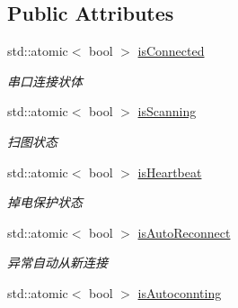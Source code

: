 \subsection*{Public Attributes}
\begin{DoxyCompactItemize}
\item 
std\+::atomic$<$ bool $>$ \hyperlink{classydlidar_1_1_y_dlidar_driver_a4457578961d36ce22035d778c0fd7f06}{is\+Connected}\hypertarget{classydlidar_1_1_y_dlidar_driver_a4457578961d36ce22035d778c0fd7f06}{}\label{classydlidar_1_1_y_dlidar_driver_a4457578961d36ce22035d778c0fd7f06}

\begin{DoxyCompactList}\small\item\em 串口连接状体 \end{DoxyCompactList}\item 
std\+::atomic$<$ bool $>$ \hyperlink{classydlidar_1_1_y_dlidar_driver_a245115a8c8a4f98d988fbee06810d0a4}{is\+Scanning}\hypertarget{classydlidar_1_1_y_dlidar_driver_a245115a8c8a4f98d988fbee06810d0a4}{}\label{classydlidar_1_1_y_dlidar_driver_a245115a8c8a4f98d988fbee06810d0a4}

\begin{DoxyCompactList}\small\item\em 扫图状态 \end{DoxyCompactList}\item 
std\+::atomic$<$ bool $>$ \hyperlink{classydlidar_1_1_y_dlidar_driver_a8a57494e849e7735fe8bf46d00b63077}{is\+Heartbeat}\hypertarget{classydlidar_1_1_y_dlidar_driver_a8a57494e849e7735fe8bf46d00b63077}{}\label{classydlidar_1_1_y_dlidar_driver_a8a57494e849e7735fe8bf46d00b63077}

\begin{DoxyCompactList}\small\item\em 掉电保护状态 \end{DoxyCompactList}\item 
std\+::atomic$<$ bool $>$ \hyperlink{classydlidar_1_1_y_dlidar_driver_aa9fe773e62367a784c888d97c1886661}{is\+Auto\+Reconnect}\hypertarget{classydlidar_1_1_y_dlidar_driver_aa9fe773e62367a784c888d97c1886661}{}\label{classydlidar_1_1_y_dlidar_driver_aa9fe773e62367a784c888d97c1886661}

\begin{DoxyCompactList}\small\item\em 异常自动从新连接 \end{DoxyCompactList}\item 
std\+::atomic$<$ bool $>$ \hyperlink{classydlidar_1_1_y_dlidar_driver_a4fcf172c55eabd5c6ca2d8c2bf14e5c6}{is\+Autoconnting}\hypertarget{classydlidar_1_1_y_dlidar_driver_a4fcf172c55eabd5c6ca2d8c2bf14e5c6}{}\label{classydlidar_1_1_y_dlidar_driver_a4fcf172c55eabd5c6ca2d8c2bf14e5c6}


\end{DoxyCompactItemize}
